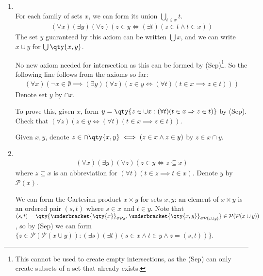 \begin{enumerate}
    \item {} \\
    For each family of sets $x$, we can form its union $\bigcup_{t \in x} t$.
    \begin{align*}
        (\forall x)(\exists y)(\forall z)(z \in y \Leftrightarrow (\exists t)(z \in t \wedge t \in x))
    \end{align*}
    The set $y$ guaranteed by this axiom can be written $\bigcup x$, and we can write $x \cup y$ for $\bigcup \qty{x, y}$.

    \begin{remark}
        No new axiom needed for intersection as this can be formed by (Sep)\footnote{This cannot be used to create empty intersections, as the (Sep) can only create subsets of a set that already exists.}.
        So the following line follows from the axioms so far:
        \begin{align*}
            (\forall x)(\neg x \in \emptyset \implies (\exists y)(\forall z)(z \in y \iff (\forall t)(t \in x \implies z \in t)))
        \end{align*}
        Denote set $y$ by $\cap x$.

        To prove this, given $x$, form $y = \qty{z \in \cup x : (\forall t)(t \in x \implies z \in t)}$ by (Sep).
        Check that $(\forall z)(z \in y \iff (\forall t)(t \in x \implies z \in t))$.

        Given $x, y$, denote $z \in \cap \qty{x, y} \iff (z \in x \wedge z \in y)$ by $z \in x \cap y$.
    \end{remark}

    \item {} \\
    \begin{align*}
        (\forall x)(\exists y)(\forall z)(z \in y \Leftrightarrow z \subseteq x)
    \end{align*}
    where $z \subseteq x$ is an abbreviation for $(\forall t)(t \in z \implies t \in x)$.
    Denote $y$ by $\mathcal{P}(x)$.

    We can form the Cartesian product $x \times y$ for sets $x, y$: an element of $x \times y$ is an ordered pair $(s, t)$ where $s \in x$ and $t \in y$.
    Note that $(s, t) = \qty{\underbracket{\qty{x}}_{\in \mathcal{P}x}, \underbracket{\qty{x, y}}_{\in \mathcal{P}(x \cup y)}} \in \mathcal{P}(\mathcal{P}(x \cup y))$, so by (Sep) we can form $\{z \in \mathcal P(\mathcal P(x \cup y)) : (\exists s)(\exists t) (s \in x \wedge t \in y \wedge z = (s, t))\}$.


\end{enumerate}
